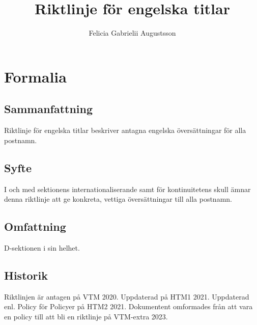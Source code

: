 \documentclass{dsekprotokoll}
\title{Riktlinje för engelska titlar}
\author{Felicia Gabrielii Augustsson}
\begin{document}
\maketitle
\section{Formalia}
\subsection{Sammanfattning}
Riktlinje för engelska titlar beskriver antagna engelska översättningar för alla postnamn.
\subsection{Syfte}
I och med sektionens internationaliserande samt för kontinuitetens skull ämnar denna riktlinje att ge konkreta, vettiga översättningar till alla postnamn.
\subsection{Omfattning}
D-sektionen i sin helhet.

\subsection{Historik}
Riktlinjen är antagen på VTM 2020.
Uppdaterad på HTM1 2021.
Uppdaterad enl. Policy för Policyer på HTM2 2021. Dokumentent omformades från att vara en policy till att bli en riktlinje på VTM-extra 2023.
\end{document}
